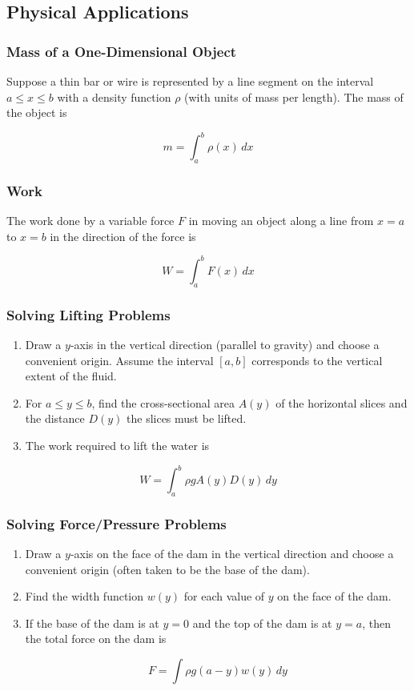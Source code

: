 \subsection{Physical Applications}
\subsubsection{Mass of a One-Dimensional Object}
Suppose a thin bar or wire is represented by a line segment on the interval $a \leq x \leq b$ with a density function $\rho$ (with units of mass per length). The mass of the object is

\begin{equation}
    m = \int _a ^b \rho(x)\, dx
\end{equation}

\subsubsection{Work}
The work done by a variable force $F$ in moving an object along a line from $x = a$ to $x = b$ in the direction of the force is

\begin{equation}
    W = \int _a ^b F(x)\, dx
\end{equation}

\subsubsection{Solving Lifting Problems}
\begin{enumerate}
    \item Draw a $y$-axis in the vertical direction (parallel to gravity) and choose a convenient origin. Assume the interval $[a, b]$ corresponds to the vertical extent of the fluid.
    \item For $a \leq y \leq b$, find the cross-sectional area $A(y)$ of the horizontal slices and the distance $D(y)$ the slices must be lifted.
    \item The work required to lift the water is
\end{enumerate}

\begin{equation}
    W = \int _a ^b \rho g A(y)D(y)\, dy
\end{equation}

\subsubsection{Solving Force/Pressure Problems}
\begin{enumerate}
    \item Draw a $y$-axis on the face of the dam in the vertical direction and choose a convenient origin (often taken to be the base of the dam).
    \item Find the width function $w(y)$ for each value of $y$ on the face of the dam.
    \item If the base of the dam is at $y = 0$ and the top of the dam is at $y = a$, then the total force on the dam is

    \begin{equation}
        F = \int \rho g (a - y) w(y)\, dy
    \end{equation}
\end{enumerate}
